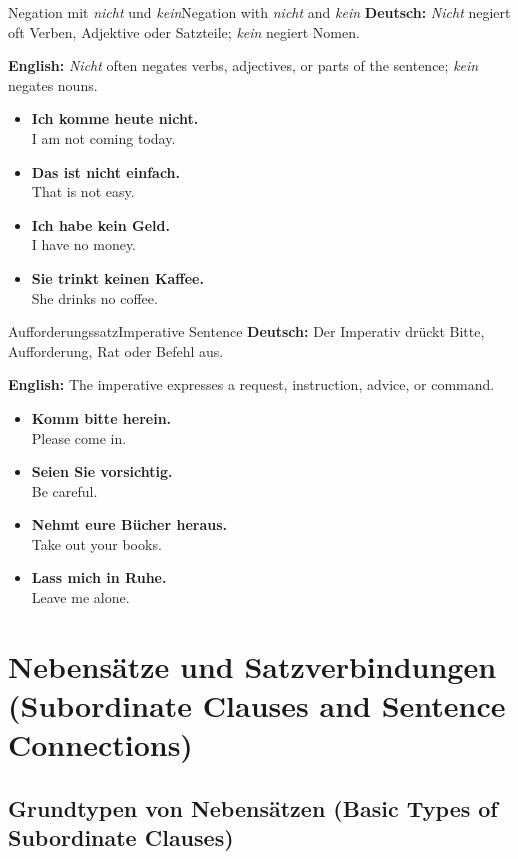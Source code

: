 \documentclass[a4paper,11pt]{article}
\newcommand{\GermanText}[1]{\textbf{Deutsch: }#1\par}
\newcommand{\EnglishText}[1]{{\color{SoftGray}\textbf{English: }#1\par}}
\newcommand{\ExampleItem}[2]{\item \textbf{#1}\\{\color{SoftGray}#2}}
\begin{document}
\begin{grammarentry}{Negation mit \textit{nicht} und \textit{kein}}{Negation with \textit{nicht} and \textit{kein}}
    \GermanText{\textit{Nicht} negiert oft Verben, Adjektive oder Satzteile; \textit{kein} negiert Nomen.}
    \EnglishText{\textit{Nicht} often negates verbs, adjectives, or parts of the sentence; \textit{kein} negates nouns.}
    \begin{exbox}
        \begin{itemize}
            \ExampleItem{Ich komme heute nicht.}{I am not coming today.}
            \ExampleItem{Das ist nicht einfach.}{That is not easy.}
            \ExampleItem{Ich habe kein Geld.}{I have no money.}
            \ExampleItem{Sie trinkt keinen Kaffee.}{She drinks no coffee.}
        \end{itemize}
    \end{exbox}
\end{grammarentry}

\begin{grammarentry}{Aufforderungssatz}{Imperative Sentence}
    \GermanText{Der Imperativ drückt Bitte, Aufforderung, Rat oder Befehl aus.}
    \EnglishText{The imperative expresses a request, instruction, advice, or command.}
    \begin{exbox}
        \begin{itemize}
            \ExampleItem{Komm bitte herein.}{Please come in.}
            \ExampleItem{Seien Sie vorsichtig.}{Be careful.}
            \ExampleItem{Nehmt eure Bücher heraus.}{Take out your books.}
            \ExampleItem{Lass mich in Ruhe.}{Leave me alone.}
        \end{itemize}
    \end{exbox}
\end{grammarentry}

\section{Nebensätze und Satzverbindungen {\small (Subordinate Clauses and Sentence Connections)}}

\subsection{Grundtypen von Nebensätzen {\small (Basic Types of Subordinate Clauses)}}
\end{document}
